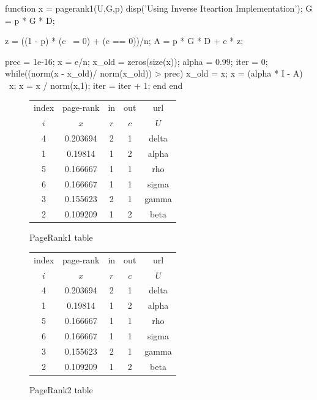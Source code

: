 \documentclass[unicode,11pt,a4paper,oneside,numbers=endperiod,openany]{scrartcl}
\begin{document}
\begin{mcode}
    function x = pagerank1(U,G,p)
    disp('Using Inverse Iteartion Implementation\n');
    G = p * G * D;

    z = ((1 - p) * (c ~= 0) + (c == 0))/n;
    A = p * G * D + e * z;

    prec = 1e-16;
    x = e/n;
    x_old = zeros(size(x));
    alpha = 0.99;
    iter = 0;
    while((norm(x - x_old)/ norm(x_old)) > prec)
    x_old = x;
    x = (alpha * I - A) \ x;
    x = x / norm(x,1);
    iter = iter + 1;
    end
    end
\end{mcode}

\begin{figure}[H]
    \centering
    \begin{minipage}{0.45\textwidth}
        \centering
        \begin{tabular}{|c|c|c|c|c|}
            \hline
            index & page-rank & in  & out & url   \\
            $i$   & $x$       & $r$ & $c$ & $U$   \\
            \hline
            4     & 0.203694  & 2   & 1   & delta \\
            1     & 0.19814   & 1   & 2   & alpha \\
            5     & 0.166667  & 1   & 1   & rho   \\
            6     & 0.166667  & 1   & 1   & sigma \\
            3     & 0.155623  & 2   & 1   & gamma \\
            2     & 0.109209  & 1   & 2   & beta  \\
            \hline
        \end{tabular}
        \caption{PageRank1 table}
    \end{minipage}%
    \hfill
    \begin{minipage}{0.45\textwidth}
        \centering
        \begin{tabular}{|c|c|c|c|c|}
            \hline
            index & page-rank & in  & out & url   \\
            $i$   & $x$       & $r$ & $c$ & $U$   \\
            \hline
            4     & 0.203694  & 2   & 1   & delta \\
            1     & 0.19814   & 1   & 2   & alpha \\
            5     & 0.166667  & 1   & 1   & rho   \\
            6     & 0.166667  & 1   & 1   & sigma \\
            3     & 0.155623  & 2   & 1   & gamma \\
            2     & 0.109209  & 1   & 2   & beta  \\
            \hline
        \end{tabular}
        \caption{PageRank2 table}
    \end{minipage}
\end{figure}
\end{document}
